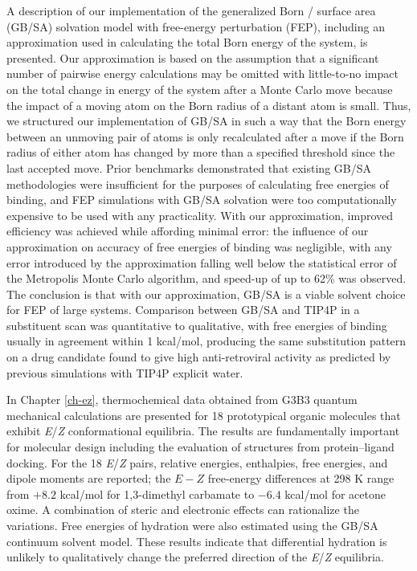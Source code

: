\documentclass[12pt]{report}
\begin{document}
\noindent A description of our implementation of the generalized Born / surface area (GB/SA) solvation model with free-energy perturbation (FEP), including an approximation used in calculating the total Born energy of the system, is presented. Our approximation is based on the assumption that a significant number of pairwise energy calculations may be omitted with little-to-no impact on the total change in energy of the system after a Monte Carlo move because the impact of a moving atom on the Born radius of a distant atom is small. Thus, we structured our implementation of GB/SA in such a way that the Born energy between an unmoving pair of atoms is only recalculated after a move if the Born radius of either atom has changed by more than a specified threshold since the last accepted move. Prior benchmarks demonstrated that existing GB/SA methodologies were insufficient for the purposes of calculating free energies of binding, and FEP simulations with GB/SA solvation were too computationally expensive to be used with any practicality. With our approximation, improved efficiency was achieved while affording minimal error: the influence of our approximation on accuracy of free energies of binding was negligible, with any error introduced by the approximation falling well below the statistical error of the Metropolis Monte Carlo algorithm, and speed-up of up to 62\% was observed. The conclusion is that with our approximation, GB/SA is a viable solvent choice for FEP of large systems. Comparison between GB/SA and TIP4P in a substituent scan was quantitative to qualitative, with free energies of binding usually in agreement within 1 kcal/mol, producing the same substitution pattern on a drug candidate found to give high anti-retroviral activity as predicted by previous simulations with TIP4P explicit water.

\newpage In Chapter \ref{ch-ez}, thermochemical data obtained from G3B3 quantum mechanical calculations are presented for 18 prototypical organic molecules that exhibit \textit{E}/\textit{Z} conformational equilibria. The results are fundamentally important for molecular design including the evaluation of structures from protein--ligand docking. For the 18 \textit{E}/\textit{Z} pairs, relative energies, enthalpies, free energies, and dipole moments are reported; the $E-Z$ free-energy differences at 298 K range from $+8.2$ kcal/mol for 1,3-dimethyl carbamate to $-6.4$ kcal/mol for acetone oxime. A combination of steric and electronic effects can rationalize the variations. Free energies of hydration were also estimated using the GB/SA continuum solvent model. These results indicate that differential hydration is unlikely to qualitatively change the preferred direction of the \textit{E}/\textit{Z} equilibria. 
 
\end{document}
